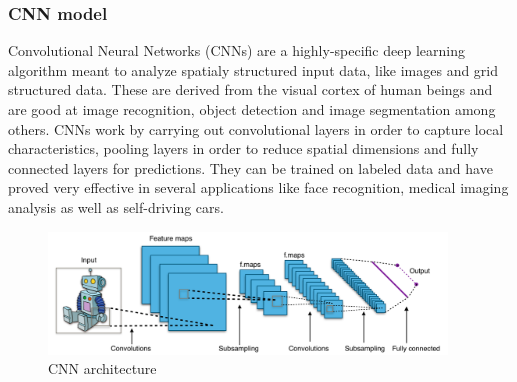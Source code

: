 


\subsubsection{CNN model}
Convolutional Neural Networks (CNNs) are a highly-specific deep learning algorithm meant to analyze spatialy structured input data, like images and grid structured data. These are derived from the visual cortex of human beings and are good at image recognition, object detection and image segmentation among others. CNNs work by carrying out convolutional layers in order to capture local characteristics, pooling layers in order to reduce spatial dimensions and fully connected layers for predictions. They can be trained on labeled data and have proved very effective in several applications like face recognition, medical imaging analysis as well as self-driving cars.\cite{CNN}
\begin{figure}[h]
	\centering
	\includegraphics[width=400px]{figures/Typical_cnn.png}
	\caption{CNN architecture \cite{CNN-architecture}}
	\label{fig:CNN-test}
\end{figure}












